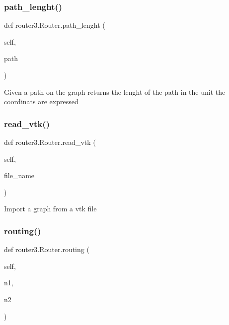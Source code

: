 \subsubsection{path\+\_\+lenght()}
{\footnotesize\ttfamily def router3.\+Router.\+path\+\_\+lenght (\begin{DoxyParamCaption}\item[{}]{self,  }\item[{}]{path }\end{DoxyParamCaption})}

\begin{DoxyVerb}Given a path on the graph returns the lenght of the path in the
unit the coordinats are expressed
\end{DoxyVerb}
 \mbox{\label{classrouter3_1_1_router_a975c34908a773e7fab09afb357d95122}} 
\subsubsection{read\+\_\+vtk()}
{\footnotesize\ttfamily def router3.\+Router.\+read\+\_\+vtk (\begin{DoxyParamCaption}\item[{}]{self,  }\item[{}]{file\+\_\+name }\end{DoxyParamCaption})}

\begin{DoxyVerb}Import a graph from a vtk file
\end{DoxyVerb}
 \mbox{\label{classrouter3_1_1_router_a71bcbcadbe60bb5d0d16d53eda79eed3}} 
\subsubsection{routing()}
{\footnotesize\ttfamily def router3.\+Router.\+routing (\begin{DoxyParamCaption}\item[{}]{self,  }\item[{}]{n1,  }\item[{}]{n2 }\end{DoxyParamCaption})}

\mbox{\label{classrouter3_1_1_router_ad9fac67fcd5dae55730df492c3be2999}} 
